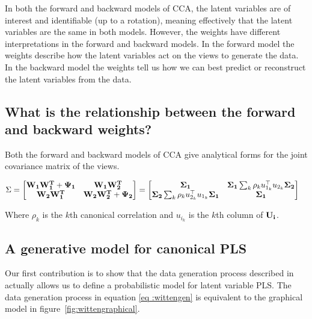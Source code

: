 In both the forward and backward models of CCA, the latent variables are of interest and identifiable (up to a
rotation), meaning effectively that the latent variables are the same in both models.
However, the weights have different interpretations in the forward and backward models.
In the forward model the weights describe how the latent variables act on the views to generate the data.
In the backward model the weights tell us how we can best predict or reconstruct the latent variables from the data.

\subsection{What is the relationship between the forward and backward weights?}

Both the forward and backward models of CCA give analytical forms for the joint covariance matrix of the views.

\begin{align}
    \Sigma &= \begin{bmatrix}
        \bold{W_1W_1^T} + \bold{\Psi_1} & \bold{W_1W_2^T} \\
        \bold{W_2W_1^T} & \bold{W_2W_2^T} + \bold{\Psi_2}
    \end{bmatrix} = \begin{bmatrix}
        \bold{\Sigma_1} & \bold{\Sigma_1}\sum_k \rho_k u_{1_k}^\top u_{2_k} \bold{\Sigma_2}  \\
        \bold{\Sigma_2}\sum_k \rho_k u_{2_k}^\top u_{1_k} \bold{\Sigma_1} & \bold{\Sigma_1}
    \end{bmatrix}
\end{align}

Where $\rho_k$ is the $k$th canonical correlation and $u_{i_k}$ is the $k$th column of $\bold{U_i}$.

\subsection{A generative model for canonical PLS}\label{subsec:a-generative-model-for-canonical-pls}

Our first contribution is to show that the data generation process described in~\cite{witten2009extensions} actually
allows us to define a probabilistic model for latent variable PLS. The data generation process in equation \ref{eq
:wittengen} is equivalent to the graphical model in figure~\ref{fig:wittengraphical}.

